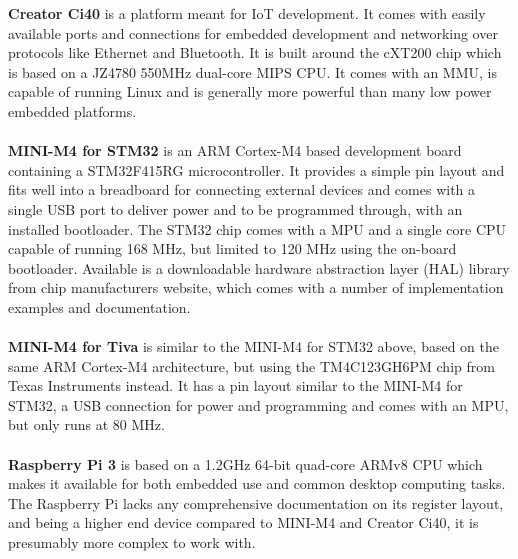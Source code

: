 \textbf{Creator Ci40} is a platform meant for IoT development.
It comes with easily available ports and connections for embedded development
and networking over protocols like Ethernet and Bluetooth.
It is built around the cXT200 chip which is based on a JZ4780 550MHz dual-core MIPS CPU\cite{creator_ci40_specs}.
It comes with an MMU, is capable of running Linux
and is generally more powerful than many low power embedded platforms.
\\\\
\textbf{MINI-M4 for STM32} is an ARM Cortex-M4 based development board containing a STM32F415RG microcontroller.
It provides a simple pin layout and fits well into a breadboard for connecting external devices
and comes with a single USB port to deliver power and to be programmed through, with an installed bootloader.
The STM32 chip comes with a MPU and a single core CPU capable of running 168 MHz,
but limited to 120 MHz using the on-board bootloader\cite{MINI-M4_stm32_specs}.
Available is a downloadable hardware abstraction layer (HAL) library from chip manufacturers website,
which comes with a number of implementation examples and documentation\cite{HAL_library}.
\\\\
\textbf{MINI-M4 for Tiva} is similar to the MINI-M4 for STM32 above,
based on the same ARM Cortex-M4 architecture,
but using the TM4C123GH6PM chip from Texas Instruments instead.
It has a pin layout similar to the MINI-M4 for STM32,
a USB connection for power and programming and comes with an MPU,
but only runs at 80 MHz\cite{MINI-M4_tiva_specs}.
\\\\
\textbf{Raspberry Pi 3} is
based on a 1.2GHz 64-bit quad-core ARMv8 CPU which
makes it available for both embedded use and common desktop computing tasks\cite{raspberry_specs}.
The Raspberry Pi lacks any comprehensive documentation on its register layout,
and being a higher end device compared to MINI-M4 and Creator Ci40,
it is presumably more complex to work with.

